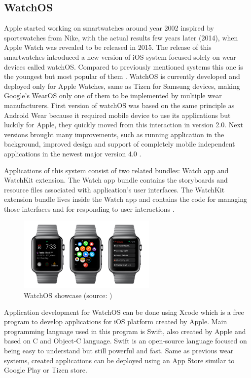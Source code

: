 \subsection{WatchOS}\label{sec:WatchOS}
Apple started working on smartwatches around year 2002 inspired by sportswatches from Nike, with the actual results few years later (2014), when Apple Watch was revealed to be released in 2015. The release of this smartwatches introduced a new version of iOS system focused solely on wear devices called watchOS. Compared to previously mentioned systems this one is the youngest but most popular of them \cite{ATOHAWWC}. WatchOS is currently developed and deployed only for Apple Watches, same as Tizen for Samsung devices, making Google's WearOS only one of them to be implemented by multiple wear manufacturers. First version of watchOS was based on the same principle as Android Wear because it required mobile device to use its applications but luckily for Apple, they quickly moved from this interaction in version 2.0. Next versions brought many improvements, such as running application in the background, improved design and support of completely mobile independent applications in the newest major version 4.0 \cite{WOS9To5MAC}.

Applications of this system consist of two related bundles: Watch app and WatchKit extension. The Watch app bundle contains the storyboards and resource files associated with application's user interfaces. The WatchKit extension bundle lives inside the Watch app and contains the code for managing those interfaces and for responding to user interactions \cite{AppleDev}.

\begin{figure}[H]
	\begin{centering}
		\includegraphics[width=0.6\textwidth]{img/apple_watchOs}
		\par\end{centering}
	\caption{WatchOS showcase (source: \cite{HTFAIAAW})\label{fig:WatchOS}}
	\label{fig06c04}
\end{figure}

Application development for WatchOS can be done using Xcode which is a free program to develop applications for iOS platform created by Apple. Main programming language used in this program is Swift, also created by Apple and based on C and Object-C language. Swift is an open-source language focused on being easy to understand but still powerful and fast. Same as previous wear systems, created applications can be deployed using an App Store similar to Google Play or Tizen store.